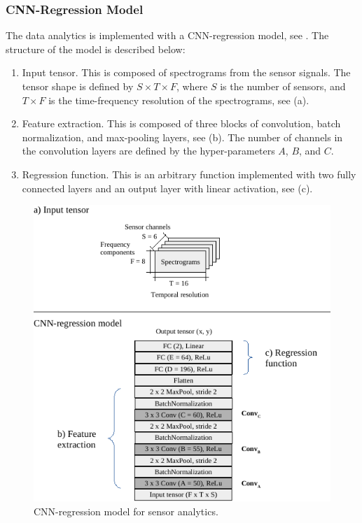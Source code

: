 \subsubsection{CNN-Regression Model}
The data analytics is implemented with a CNN-regression model, see . The structure of the model is described below:

\begin{enumerate}[label=\alph*)]
\item Input tensor. This is composed of spectrograms from the sensor signals. The tensor shape is defined by $S \times T \times F$, where $S$ is the number of sensors, and $T \times F$ is the time-frequency resolution of the spectrograms, see (a).

\item Feature extraction. This is composed of three blocks of convolution, batch normalization, and max-pooling layers, see (b). The number of channels in the convolution layers are defined by the hyper-parameters $A$, $B$, and $C$.

\item Regression function. This is an arbitrary function implemented with two fully connected layers and an output layer with linear activation, see (c).
\end{enumerate}


\begin{figure}[t!]
	\centering
	\includegraphics[width=\columnwidth]{../figures/models.pdf}
	\caption{CNN-regression model for sensor analytics.}
	\label{fig:model}
\end{figure}


